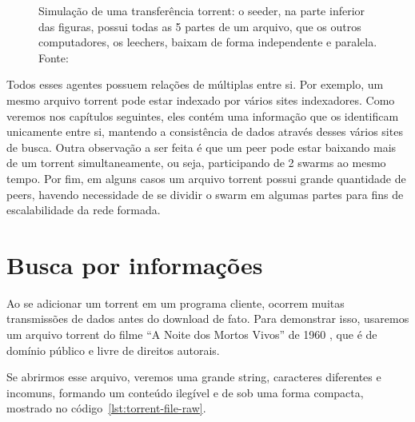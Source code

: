 \begin{figure}[H]
    \vspace{\myvsize}

    \begin{subfigure}[H]{\myhsize}
        \caption{}
        \label{fig:torrent-repr-9}
    \end{subfigure}

    \caption{Simulação de uma transferência torrent: o \gls{seeder}, na parte
    inferior das figuras, possui todas as 5 partes de um arquivo, que os outros
    computadores, os \glspl{leecher}, baixam de forma independente e paralela. Fonte:
    \cite{fig:torrent-dl}}
    \label{fig:torrent-repr}
\end{figure}

Todos esses agentes possuem relações de múltiplas entre si. Por exemplo, um mesmo
arquivo \gls*{torrent} pode estar indexado por vários sites indexadores. Como veremos
nos capítulos seguintes, eles contém uma informação que os identificam unicamente entre
si, mantendo a consistência de dados através desses vários sites de busca. Outra
observação a ser feita é que um \gls*{peer} pode estar baixando mais de um
\gls*{torrent} simultaneamente, ou seja, participando de 2 \glspl*{swarm} ao mesmo
tempo. Por fim, em alguns casos um arquivo \gls*{torrent} possui grande quantidade de
\glspl*{peer}, havendo necessidade de se dividir o \gls*{swarm} em algumas partes para
fins de escalabilidade da rede formada.

\section{Busca por informações}

Ao se adicionar um \gls*{torrent} em um programa cliente, ocorrem muitas transmissões de
dados antes do download de fato. Para demonstrar isso, usaremos um arquivo torrent do
filme ``A Noite dos Mortos Vivos'' de 1960 \cite{torrent-file}, que é de domínio público
e livre de direitos autorais.

Se abrirmos esse arquivo, veremos uma grande \gls{string}, caracteres diferentes e
incomuns, formando um conteúdo ilegível e de sob uma forma compacta, mostrado no
código~\ref{lst:torrent-file-raw}.

